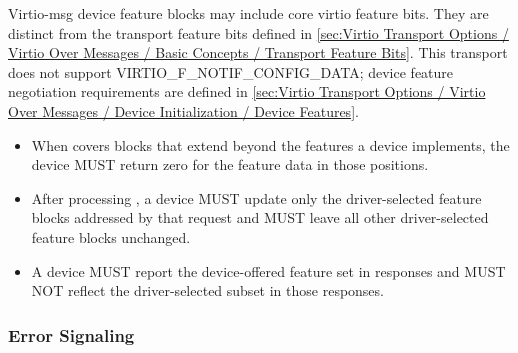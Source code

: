 Virtio-msg device feature blocks may include core virtio feature bits. They are
distinct from the transport feature bits defined in
\ref{sec:Virtio Transport Options / Virtio Over Messages / Basic Concepts / Transport Feature Bits}.
This transport does not support VIRTIO\_F\_NOTIF\_CONFIG\_DATA; device feature
negotiation requirements are defined in
\ref{sec:Virtio Transport Options / Virtio Over Messages / Device Initialization / Device Features}.

\begin{itemize}
  \item When  covers blocks that extend beyond the
        features a device implements, the device MUST return zero for the
        feature data in those positions.
  \item After processing , a device MUST update
        only the driver-selected feature blocks addressed by that request and
        MUST leave all other driver-selected feature blocks unchanged.
  \item A device MUST report the device-offered feature set in
         responses and MUST NOT reflect the
        driver-selected subset in those responses.
\end{itemize}

\subsubsection{Error Signaling}
\label{sec:Virtio Transport Options / Virtio Over Messages / Basic Concepts / Error Signaling}

